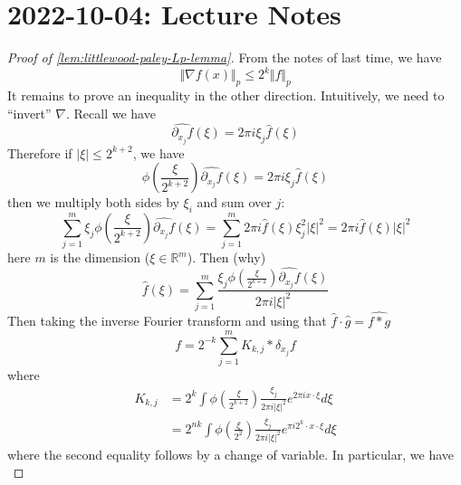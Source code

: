 \documentclass{article}
\def\R{\mathbb{R}} %
\newcommand{\norm}[1]{\Vert #1 \Vert }
\begin{document}
\section{2022-10-04: Lecture Notes}
\begin{proof}[Proof of \cref{lem:littlewood-paley-Lp-lemma}]
  From the notes of last time, we have
  \begin{equation*}
    \norm{\nabla f(x)}_{p} \leq  2^{k}\norm{f}_{p}
  \end{equation*}
  It remains to prove an inequality in the other direction. Intuitively, we need to ``invert'' $\nabla$. Recall
  we have
  \begin{equation*}
    \widehat{\partial_{x_{j}}f}(\xi) = 2\pi i\xi_{j} \widehat{f}(\xi)
  \end{equation*}
  Therefore if $|\xi| \leq  2^{k+2}$, we have
  \begin{equation*}
    \phi\left(\frac{\xi}{2^{k+2}}\right)\widehat{\partial_{x_{j}}f}(\xi) = 2\pi i \xi_{j}\widehat{f}(\xi)
  \end{equation*}
  then we multiply both sides by $\xi_{i}$ and sum over $j$:
  \begin{equation*}
    \sum_{j=1}^{m} \xi_{j}\phi\left(\frac{\xi}{2^{k+2}}\right)\widehat{\partial_{x_{j}}f}(\xi) 
    = \sum_{j=1}^{m} 2\pi i \widehat{f}(\xi)\xi^{2}_{j}|\xi|^{2}
    = 2\pi i \hat{f}(\xi)|\xi|^{2}
  \end{equation*}
  here $m$ is the dimension ($\xi\in \R^m$). Then (why)
  \begin{equation*}
    \widehat{f}(\xi) 
    = \sum_{j=1}^{m} \frac{\xi_{j}\phi \left( \frac{\xi}{2^{k+2}} \right) \widehat{\partial_{x_{j}}f}(\xi) }{2\pi i |\xi|^{2}} 
  \end{equation*}
  Then taking the inverse Fourier transform and using that $\widehat{f}\cdot\widehat{g}=
  \widehat{f*g}$
  \begin{equation}\label{eq:4} 
    f = 2^{-k}\sum_{j=1}^{m}K_{k,j}* \delta_{x_{j}}f 
  \end{equation}
  where
  \begin{align*}
    K_{k,j} 
    &= 2^{k}\int \phi \left( \frac{\xi}{2^{k+2}}
      \right)\frac{\xi_{j}}{2\pi i |\xi|^{2}} e^{2\pi i x \cdot \xi} d\xi\\
    &=2^{nk} \int \phi \left( \frac{\xi}{2^{2}} \right) \frac{\xi_{j}}{2\pi i |\xi|^{2}}e^{\pi i 2^{k}\cdot x\cdot \xi}d\xi 
  \end{align*}
  where the second equality follows by a change of variable. In particular, we
  have
  \begin{equation*}

\end{equation*}
\end{proof}
\end{document}
